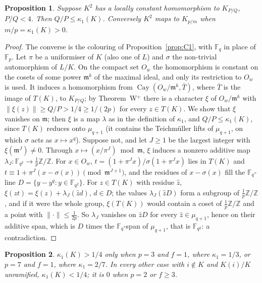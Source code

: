 \documentclass[11pt,a4paper]{amsart}
\newtheorem{proposition}{Proposition}
\theoremstyle{remark}
\newcommand{\Z}{\mathbb{Z}}
\newcommand{\F}{\mathbb{F}}
\newcommand{\Cay}{\operatorname{Cay}}
\begin{document}
\begin{proposition}\label{prop:levels}
Suppose $K^2$ has a locally constant homomorphism to $K_{P/Q}$, $P/Q<4$. Then $Q/P\le\kappa_1(K)$. Conversely $K^2$ maps to $K_{p/m}$ when $m/p=\kappa_1(K)>0$.
\end{proposition}

\begin{proof}
The converse is the colouring of Proposition~\ref{prop:C1}, with $\F_q$ in place of $\F_p$. Let $\pi$ be a
uniformiser of $K$ (also one of $L$) and $\sigma$ the non-trivial automorphism of $L/K$. On the compact set
$O_w$ the homomorphism is constant on the cosets of some power $\mathfrak m^k$ of the maximal ideal, and only its
restriction to $O_w$ is used. It induces a homomorphism from $\Cay(O_w/\mathfrak m^k,\bar T)$, where
$\bar T$ is the image of $T(K)$, to $K_{P/Q}$; by Theorem~W$^+$ there is a character $\xi$ of
$O_w/\mathfrak m^k$ with $\|\xi(z)\|\ge Q/P>1/4\ge1/(2p)$ for every $z\in T(K)$. We show that $\xi$ vanishes on
$\mathfrak m$; then $\xi$ is a map $\lambda$ as in the definition of $\kappa_1$, and $Q/P\le\kappa_1(K)$, since $T(K)$
reduces onto $\mu_{q+1}$ (it contains the Teichm\"uller lifts of $\mu_{q+1}$, on which $\sigma$ acts as
$x\mapsto x^q$). Suppose not, and let $J\ge1$ be the largest integer with $\xi(\mathfrak m^J)\ne0$. Through
$x\mapsto(x/\pi^J)\bmod\mathfrak m$, $\xi$ induces a nonzero additive map $\lambda_J:\F_{q^2}\to\frac1p\Z/\Z$. For
$x\in O_w$, $t=(1+\pi^Jx)/\sigma(1+\pi^Jx)$ lies in $T(K)$ and $t\equiv1+\pi^J(x-\sigma(x))\pmod{\mathfrak m^{J+1}}$,
and the residues of $x-\sigma(x)$ fill the $\F_q$-line $D=\{y-y^q:y\in\F_{q^2}\}$. For $z\in T(K)$ with residue
$\hat z$, $\xi(zt)=\xi(z)+\lambda_J(\hat zd)$, $d\in D$; the values $\lambda_J(\hat zD)$ form a subgroup of
$\frac1p\Z/\Z$, and if it were the whole group, $\xi(T(K))$ would contain a coset of $\frac1p\Z/\Z$ and a point
with $\|\cdot\|\le\frac1{2p}$. So $\lambda_J$ vanishes on $\hat zD$ for every $\hat z\in\mu_{q+1}$, hence on their
additive span, which is $D$ times the $\F_q$-span of $\mu_{q+1}$, that is $\F_{q^2}$: a contradiction.
\end{proof}

\begin{proposition}\label{prop:residue}
$\kappa_1(K)>1/4$ only when $p=3$ and $f=1$, where $\kappa_1=1/3$, or $p=7$ and $f=1$, where $\kappa_1=2/7$.
In every other case with $i\notin K$ and $K(i)/K$ unramified, $\kappa_1(K)<1/4$; it is $0$ when $p=2$ or $f\ge3$.
\end{proposition}
\end{document}
